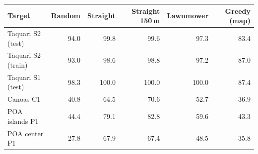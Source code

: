 \begin{tabular}{@{}lrrrrr@{}}
\toprule
Target & Random & Straight & Straight 150\,m & Lawnmower & Greedy (map) \\
\midrule
Taquari S2 (test) & 94.0 & 99.8 & 99.6 & 97.3 & 83.4 \\
Taquari S2 (train) & 93.0 & 98.6 & 98.8 & 97.2 & 87.0 \\
Taquari S1 (test) & 98.3 & 100.0 & 100.0 & 100.0 & 87.4 \\
Canoas C1 & 40.8 & 64.5 & 70.6 & 52.7 & 36.9 \\
POA islands P1 & 44.4 & 79.1 & 82.8 & 59.6 & 43.3 \\
POA center P1 & 27.8 & 67.9 & 67.4 & 48.5 & 35.8 \\
\bottomrule
\end{tabular}
